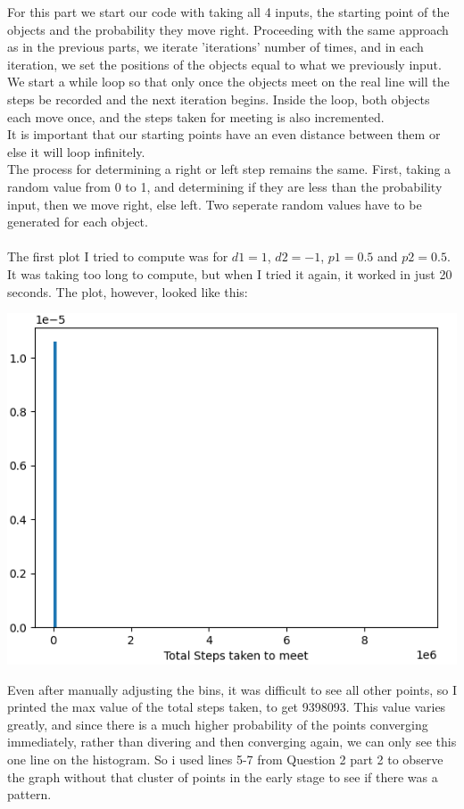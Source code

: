 \documentclass[addpoints]{exam}
\begin{document}
\begin{questions}
\newpage
\question

For this part we start our code with taking all 4 inputs, the starting point of the objects and the probability they move right. Proceeding with the same approach as in the previous parts, we iterate 'iterations' number of times, and in each iteration, we set the positions of the objects equal to what we previously input. We start a while loop so that only once the objects meet on the real line will the steps be recorded and the next iteration begins. Inside the loop, both objects each move once, and the steps taken for meeting is also incremented.\\
It is important that our starting points have an even distance between them or else it will loop infinitely.\\
The process for determining a right or left step remains the same. First, taking a random value from 0 to 1, and determining if they are less than the probability input, then we move right, else left. Two seperate random values have to be generated for each object.\\
\\
The first plot I tried to compute was for $d1=1$, $d2=-1$, $p1=0.5$ and $p2=0.5$. It was taking too long to compute, but when I tried it again, it worked in just 20 seconds. The plot, however, looked like this:\\
\begin{center}
\includegraphics[width=.48\textwidth]{images/p1_3_1.png}
\end{center}
Even after manually adjusting the bins, it was difficult to see all other points, so I printed the max value of the total steps taken, to get 9398093. This value varies greatly, and since there is a much higher probability of the points converging immediately, rather than divering and then converging again, we can only see this one line on the histogram. So i used lines 5-7 from Question 2 part 2 to observe the graph without that cluster of points in the early stage to see if there was a pattern.
\begin{center}

\end{center}
\end{questions}
\end{document}
